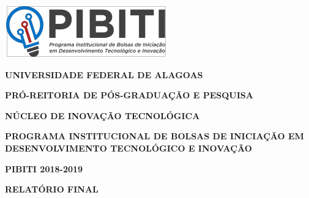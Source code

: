 \documentclass[a4paper,12pt]{article}
\begin{document}
    \begin{center}
        \includegraphics[width=.30\linewidth]{logo.png}
    
        \textbf{UNIVERSIDADE FEDERAL DE ALAGOAS}
    
        \textbf{PRÓ-REITORIA DE PÓS-GRADUAÇÃO E PESQUISA}
    
        \textbf{NÚCLEO DE INOVAÇÃO TECNOLÓGICA}
    
        \textbf{PROGRAMA INSTITUCIONAL DE BOLSAS DE INICIAÇÃO EM
        DESENVOLVIMENTO TECNOLÓGICO E INOVAÇÃO}
    
        \textbf{PIBITI 2018-2019}
    
        \textbf{RELATÓRIO FINAL}
    \end{center}
    
\end{document}
